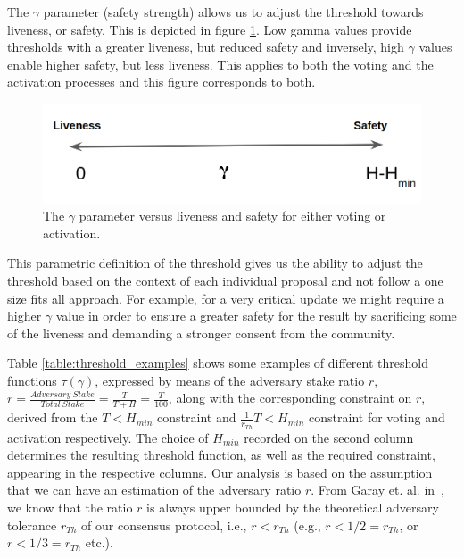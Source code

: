 \documentclass[11pt,a4paper]{article}
\begin{document}
The $\gamma$ parameter (safety strength) allows us to adjust the threshold
towards liveness, or safety. This is depicted in figure
\ref{fig:gamma_parameter}. Low gamma values provide thresholds with a greater
liveness, but reduced safety and inversely, high $\gamma$ values enable higher
safety, but less liveness. This applies to both the voting and the activation
processes and this figure corresponds to both.

\begin{figure}[h!]
	\centering
	\includegraphics[width=0.6\columnwidth,
	keepaspectratio]{figures/gamma.png}
	\caption{The $\gamma$ parameter versus liveness and safety for either
	voting or activation.}
	\label{fig:gamma_parameter}
\end{figure}

This parametric definition of the threshold gives us the ability to adjust the
threshold based on the context of each individual proposal and not follow a one
size fits all approach. For example, for a very critical update we might
require a higher $\gamma$ value in order to ensure a greater safety for the
result by sacrificing some of the liveness and demanding a stronger consent
from the community.

Table \ref{table:threshold_examples} shows some examples of different threshold
functions $\tau(\gamma)$, expressed by means of the adversary stake ratio $r$,
$r = \frac{Adversary\ Stake}{Total\ Stake} = \frac{T}{T+H} = \frac{T}{100}$,
along with the corresponding constraint on $r$, derived from the $T < H_{min}$
constraint and $\frac{1}{r_{Th}}T < H_{min}$ constraint for voting and
activation respectively. The choice of $H_{min}$ recorded on the second column
determines the resulting threshold function, as well as the required constraint,
appearing in the respective columns. Our analysis is based on the assumption
that we can have an estimation of the adversary ratio $r$. From Garay et. al.
in~\cite{sok}, we know that the ratio $r$ is always upper bounded by the
theoretical adversary tolerance $r_{Th}$ of our consensus protocol, i.e.,
$r < r_{Th}$ (e.g., $r < 1/2 = r_{Th}$, or $r < 1/3 = r_{Th}$ etc.).
\end{document}
